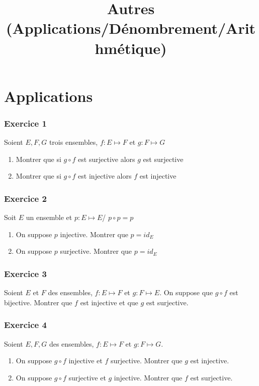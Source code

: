 \documentclass[11pt]{article}
\author{\Name \texttt{\Login}}
\date{}
\title{Autres (Applications/Dénombrement/Arithmétique)}
\begin{document}
\maketitle
\part*{Applications}

\section*{Exercice 1}

Soient $E,F,G$ trois ensembles, $f:E\mapsto F$ et $g:F\mapsto G$

\begin{enumerate}
\item Montrer que si $g\circ f$ est surjective alors $g$ est surjective
\item Montrer que si $g\circ f$ est injective alors $f$ est injective
\end{enumerate}

\section*{Exercice 2}

Soit $E$ un ensemble et $p:E\mapsto E$/ $p\circ p=p$
\begin{enumerate}
\item On suppose $p$ injective. Montrer que $p = id_E$
\item On suppose $p$ surjective. Montrer que $p = id_E$
\end{enumerate}

\section*{Exercice 3}

Soient $E$ et $F$ des ensembles, $f:E\mapsto F$ et $g:F\mapsto E$. On suppose que $g\circ f$ est bijective.
Montrer que $f$ est injective et que $g$ est surjective.

\section*{Exercice 4}

Soient $E,F,G$ des ensembles, $f:E\mapsto F$ et $g:F\mapsto G$.
\begin{enumerate}
\item On suppose $g\circ f$ injective et $f$ surjective. Montrer que $g$ est injective.
\item On suppose $g\circ f$ surjective et $g$ injective. Montrer que $f$ est surjective.

\end{enumerate}
\end{document}
